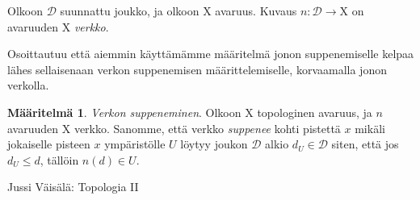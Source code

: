\documentclass[12pt,a4paper,leqno]{report}
\newcommand{\X}{\mathrm{X}}
\newcommand{\D}{\mathcal{D}}
\newcommand{\verkop}{\leq}
\theoremstyle{plain}
\theoremstyle{definition}
\newtheorem{maar}[equation]{Määritelmä}
\theoremstyle{remark}
\begin{document}
Olkoon $\D$ suunnattu joukko, ja olkoon $\X$ avaruus. Kuvaus $n : \D \to \X$ on avaruuden $\X$ \emph{verkko}.

Osoittautuu että aiemmin käyttämämme määritelmä jonon suppenemiselle kelpaa lähes sellaisenaan verkon suppenemisen määrittelemiselle, korvaamalla jonon verkolla.

\begin{maar}\label{verksupmaar}
\emph{Verkon suppeneminen}. Olkoon $\X$ topologinen avaruus, ja $n$ avaruuden $\X$ verkko. Sanomme, että verkko \emph{suppenee} kohti pistettä $x$ mikäli jokaiselle pisteen $x$ ympäristölle $U$ löytyy joukon $\D$ alkio $d_U \in \D$ siten, että jos $d_U \verkop d$, tällöin $n(d) \in U$.  
\end{maar}

\begin{thebibliography}{9}

Jussi Väisälä: Topologia II
\end{thebibliography}
\end{document}
